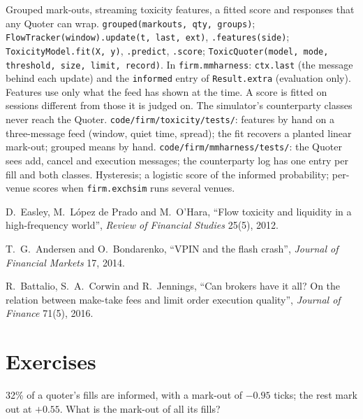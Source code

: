 \begin{build}
 Grouped mark-outs, streaming toxicity features, a fitted score and responses that any Quoter can wrap.
 \texttt{grouped(markouts, qty, groups)}; \texttt{FlowTracker(window).update(t, last, ext)}, \texttt{.features(side)};
\texttt{ToxicityModel.fit(X, y)}, \texttt{.predict}, \texttt{.score}; \texttt{ToxicQuoter(model, mode, threshold, size, limit, record)}. In
\texttt{firm.mmharness}: \texttt{ctx.last} (the message behind each update) and the \texttt{informed} entry of \texttt{Result.extra} (evaluation only).
 Features use only what the feed has shown at the time. A score is fitted on sessions different from those it is judged on. The
simulator's counterparty classes never reach the Quoter.
 \texttt{code/firm/toxicity/tests/}: features by hand on a three-message feed (window, quiet time, spread); the fit
recovers a planted linear mark-out; grouped means by hand. \texttt{code/firm/mmharness/tests/}: the Quoter sees add, cancel and execution messages;
the counterparty log has one entry per fill and both classes.
 Hysteresis; a logistic score of the informed probability; per-venue scores when \texttt{firm.exchsim} runs several venues.
\end{build}

\begin{omsources}
\item D.~Easley, M.~López de Prado and M.~O'Hara, ``Flow toxicity and liquidity in a high-frequency world'', \emph{Review of Financial Studies}
25(5), 2012.
\item T.~G.~Andersen and O.~Bondarenko, ``VPIN and the flash crash'', \emph{Journal of Financial Markets} 17, 2014.
\item R.~Battalio, S.~A.~Corwin and R.~Jennings, ``Can brokers have it all? On the relation between make-take fees and limit order execution
quality'', \emph{Journal of Finance} 71(5), 2016.
\end{omsources}

\section{Exercises}

\begin{exercise}[$\star$]\label{exo:hf:adverse-selection-and-toxicity:1}
32\% of a quoter's fills are informed, with a mark-out of $-0.95$ ticks; the rest mark out at $+0.55$. What is the mark-out of all its fills?
\end{exercise}


